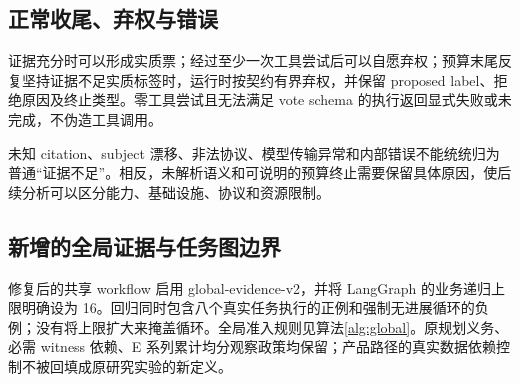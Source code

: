\subsection{正常收尾、弃权与错误}
证据充分时可以形成实质票；经过至少一次工具尝试后可以自愿弃权；预算末尾反复坚持证据不足实质标签时，运行时按契约有界弃权，并保留 proposed label、拒绝原因及终止类型。零工具尝试且无法满足 vote schema 的执行返回显式失败或未完成，不伪造工具调用。

未知 citation、subject 漂移、非法协议、模型传输异常和内部错误不能统统归为普通“证据不足”。相反，未解析语义和可说明的预算终止需要保留具体原因，使后续分析可以区分能力、基础设施、协议和资源限制。


\subsection{新增的全局证据与任务图边界}
修复后的共享 workflow 启用 global-evidence-v2，并将 LangGraph 的业务递归上限明确设为 16。回归同时包含八个真实任务执行的正例和强制无进展循环的负例；没有将上限扩大来掩盖循环。全局准入规则见算法\ref{alg:global}。原规划义务、必需 witness 依赖、E 系列累计均分观察政策均保留；产品路径的真实数据依赖控制不被回填成原研究实验的新定义。
